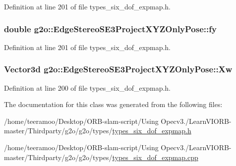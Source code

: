 Definition at line 201 of file types\+\_\+six\+\_\+dof\+\_\+expmap.\+h.

\subsubsection[{\texorpdfstring{fy}{fy}}]{\setlength{\rightskip}{0pt plus 5cm}double g2o\+::\+Edge\+Stereo\+S\+E3\+Project\+X\+Y\+Z\+Only\+Pose\+::fy}\hypertarget{classg2o_1_1EdgeStereoSE3ProjectXYZOnlyPose_a7f779153148f1eb403ab6f2984b47eec}{}\label{classg2o_1_1EdgeStereoSE3ProjectXYZOnlyPose_a7f779153148f1eb403ab6f2984b47eec}


Definition at line 201 of file types\+\_\+six\+\_\+dof\+\_\+expmap.\+h.

\subsubsection[{\texorpdfstring{Xw}{Xw}}]{\setlength{\rightskip}{0pt plus 5cm}Vector3d g2o\+::\+Edge\+Stereo\+S\+E3\+Project\+X\+Y\+Z\+Only\+Pose\+::\+Xw}\hypertarget{classg2o_1_1EdgeStereoSE3ProjectXYZOnlyPose_aa7c861f93edd02d3ef763c0e706cf496}{}\label{classg2o_1_1EdgeStereoSE3ProjectXYZOnlyPose_aa7c861f93edd02d3ef763c0e706cf496}


Definition at line 200 of file types\+\_\+six\+\_\+dof\+\_\+expmap.\+h.



The documentation for this class was generated from the following files\+:\begin{DoxyCompactItemize}
\item 
/home/teeramoo/\+Desktop/\+O\+R\+B-\/slam-\/script/\+Using Opecv3./\+Learn\+V\+I\+O\+R\+B-\/master/\+Thirdparty/g2o/g2o/types/\hyperlink{types__six__dof__expmap_8h}{types\+\_\+six\+\_\+dof\+\_\+expmap.\+h}\item 
/home/teeramoo/\+Desktop/\+O\+R\+B-\/slam-\/script/\+Using Opecv3./\+Learn\+V\+I\+O\+R\+B-\/master/\+Thirdparty/g2o/g2o/types/\hyperlink{types__six__dof__expmap_8cpp}{types\+\_\+six\+\_\+dof\+\_\+expmap.\+cpp}\end{DoxyCompactItemize}
